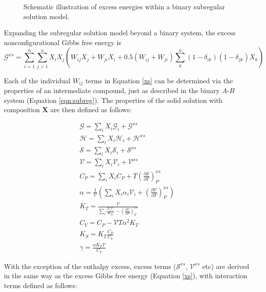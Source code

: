 \begin{figure}[ht!]
  \centering
  \caption{Schematic illustration of excess energies within a binary subregular solution model.}
  \label{fig:schematic}
\end{figure}


Expanding the subregular solution model beyond a binary system, the excess nonconfigurational Gibbs free energy is \citep{HW1989} 
\begin{equation}
  \mathcal{G}^{xs} = \sum_{i=1}^n \sum_{j>1}^n X_i X_j \left ( W_{ij} X_j + W_{ji} X_i + 0.5 (W_{ij} + W_{ji}) \sum_k^n (1-\delta_{ik})(1-\delta_{jk}) X_k \right)
  \label{xs}
\end{equation}

Each of the individual $W_{ij}$ terms in Equation \ref{xs} can be determined via the properties of an intermediate compound, just as described in the binary $A$-$B$ system (Equation \ref{eqn:subreg}). The properties of the solid solution with composition $\mathbf{X}$ are then defined as follows:

\begin{eqnarray}
\mathcal{G} = \sum_i X_i \mathcal{G}_i + \mathcal{G}^{xs} \\
\mathcal{H} = \sum_i X_i \mathcal{H}_i + \mathcal{H}^{xs} \\
\mathcal{S} = \sum_i X_i \mathcal{S}_i + \mathcal{S}^{xs} \\
\mathcal{V} = \sum_i X_i \mathcal{V}_i + \mathcal{V}^{xs} \\
C_P = \sum_i X_i C_P  + T \left( \frac{\partial \mathcal{S}}{\partial T} \right)_P^{xs} \\
\alpha = \frac{1}{\mathcal{V}} \left ( \sum_i X_i \alpha_i \mathcal{V}_i + \left( \frac{\partial \mathcal{V}}{\partial T} \right)_P^{xs} \right) \label{alpha} \\
K_T = \frac{\mathcal{V}}{\sum_i \frac{X_i \mathcal{V}_i }{K_{Ti}} - \left( \frac{\partial \mathcal{V}}{\partial P} \right)_T^{xs} } \label{K_T} \\
C_V = C_P - \mathcal{V} T \alpha^2 K_T \\
K_S = K_T \frac{C_P}{C_V} \\
\gamma = \frac{\alpha K_T \mathcal{V}}{C_V}   
\end{eqnarray}

With the exception of the enthalpy excess, excess terms ($\mathcal{S}^{xs}$, $\mathcal{V}^{xs}$ etc) are derived in the same way as the excess Gibbs free energy (Equation \ref{xs}), with interaction terms defined as follows:

